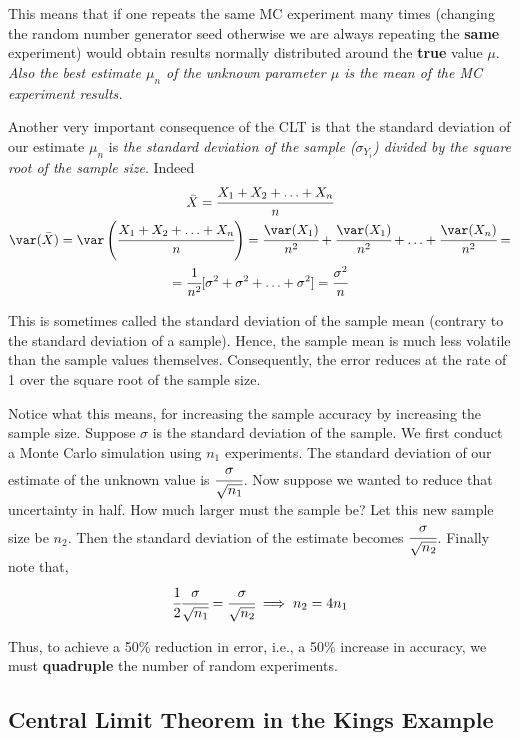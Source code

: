 This means that if one repeats the same MC experiment many times (changing the random number generator seed otherwise we are always repeating the \textbf{same} experiment) would obtain results normally distributed around the \textbf{true} value $\mu$. \emph{Also the best estimate $\mu_n$ of the unknown parameter $\mu$ is the mean of the MC experiment results.}

Another very important consequence of the CLT is that the standard deviation of our estimate $\mu_n$ is \emph{the standard deviation of the sample ($\sigma_{Y_i}$) divided by the square root of the sample size}. Indeed
\begin{equation*}
\begin{gathered}
\bar{X} = \cfrac{X_1 + X_2 +\ldots +X_n}{n}\\
\var(\bar{X}) = \var\left(\cfrac{X_1 + X_2 +\ldots +X_n}{n}\right)=\cfrac{\var(X_1)}{n^2}+\cfrac{\var(X_1)}{n^2}+\ldots+\cfrac{\var(X_n)}{n^2} = \\
=\cfrac{1}{n^2}[\sigma^2+\sigma^2+\ldots+\sigma^2] = \cfrac{\sigma^2}{n}
\end{gathered}
\end{equation*}

This is sometimes called the standard deviation of the sample mean (contrary to the standard deviation of a sample). Hence, the sample mean is much less volatile than the sample values themselves. Consequently, the error reduces at the rate of 1 over the square root of the sample size. 

Notice what this means, for increasing the sample accuracy by increasing the sample size. Suppose $\sigma$ is the standard deviation of the sample. We first conduct a Monte Carlo simulation using $n_1$ experiments. The standard deviation of our estimate of the unknown value is $\cfrac{\sigma}{\sqrt{n_1}}$. Now suppose we wanted to reduce that uncertainty in half. How much larger must the sample be? Let this new sample size be $n_2$. Then the standard deviation of the estimate becomes $\cfrac{\sigma}{\sqrt{n_2}}$.
Finally note that,
\begin{equation*}
  \cfrac{1}{2}\cfrac{\sigma}{\sqrt{n_1}}  = \cfrac{\sigma}{\sqrt{n_2}} \implies n_2 = 4 n_1
\end{equation*}

Thus, to achieve a 50\% reduction in error, i.e., a 50\% increase in accuracy, we must \textbf{quadruple} the number of random experiments.

\subsection{Central Limit Theorem in the Kings Example}

